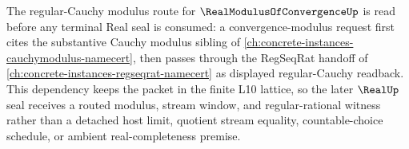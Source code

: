 The regular-Cauchy modulus route for $\RealModulusOfConvergenceUp$ is read before any terminal Real seal is consumed: a convergence-modulus request first cites the substantive Cauchy modulus sibling of \autoref{ch:concrete-instances-cauchymodulus-namecert}, then passes through the RegSeqRat handoff of \autoref{ch:concrete-instances-regseqrat-namecert} as displayed regular-Cauchy readback. This dependency keeps the packet in the finite L10 lattice, so the later $\RealUp$ seal receives a routed modulus, stream window, and regular-rational witness rather than a detached host limit, quotient stream equality, countable-choice schedule, or ambient real-completeness premise.
